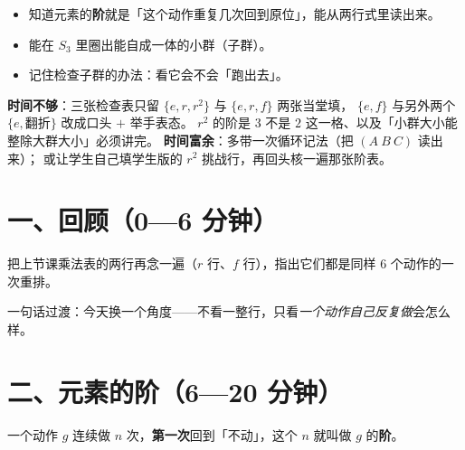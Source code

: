 

\begin{mubiao}
  \begin{itemize}
    \item 知道元素的\textbf{阶}就是「这个动作重复几次回到原位」，能从两行式里读出来。
    \item 能在 \(S_3\) 里圈出能自成一体的小群（子群）。
    \item 记住检查子群的办法：看它会不会「跑出去」。
  \end{itemize}
\end{mubiao}


\begin{beifen}
  \textbf{时间不够}：三张检查表只留 \(\{e,r,r^2\}\) 与 \(\{e,r,f\}\) 两张当堂填，
  \(\{e,f\}\) 与另外两个 \(\{e,\text{翻折}\}\) 改成口头 \(+\) 举手表态。
  \(r^2\) 的阶是 \(3\) 不是 \(2\) 这一格、以及「小群大小能整除大群大小」必须讲完。
  \textbf{时间富余}：多带一次循环记法（把 \((A\ B\ C)\) 读出来）；
  或让学生自己填学生版的 \(r^2\) 挑战行，再回头核一遍那张阶表。
\end{beifen}

\section*{一、回顾（0—6 分钟）}

把上节课乘法表的两行再念一遍（\(r\) 行、\(f\) 行），指出它们都是同样 \(6\) 个动作的一次重排。

一句话过渡：今天换一个角度——不看一整行，只看\emph{一个动作自己反复做}会怎么样。

\section*{二、元素的阶（6—20 分钟）}

\begin{definition}[元素的阶]
  一个动作 \(g\) 连续做 \(n\) 次，\textbf{第一次}回到「不动」，这个 \(n\)
  就叫做 \(g\) 的\textbf{阶}。
\end{definition}


